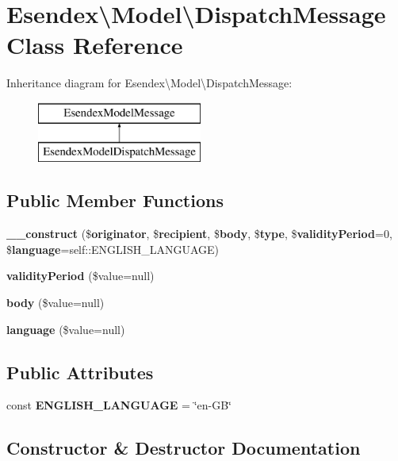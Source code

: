 \section{Esendex\textbackslash{}Model\textbackslash{}Dispatch\-Message Class Reference}
\label{class_esendex_1_1_model_1_1_dispatch_message}
Inheritance diagram for Esendex\textbackslash{}Model\textbackslash{}Dispatch\-Message\-:\begin{figure}[H]
\begin{center}
\leavevmode
\includegraphics[height=2.000000cm]{class_esendex_1_1_model_1_1_dispatch_message}
\end{center}
\end{figure}
\subsection*{Public Member Functions}
\begin{DoxyCompactItemize}
\item 
{\bf \-\_\-\-\_\-construct} (\${\bf originator}, \${\bf recipient}, \${\bf body}, \${\bf type}, \${\bf validity\-Period}=0, \${\bf language}=self\-::\-E\-N\-G\-L\-I\-S\-H\-\_\-\-L\-A\-N\-G\-U\-A\-G\-E)
\item 
{\bf validity\-Period} (\$value=null)
\item 
{\bf body} (\$value=null)
\item 
{\bf language} (\$value=null)
\end{DoxyCompactItemize}
\subsection*{Public Attributes}
\begin{DoxyCompactItemize}
\item 
const {\bfseries E\-N\-G\-L\-I\-S\-H\-\_\-\-L\-A\-N\-G\-U\-A\-G\-E} = \char`\"{}en-\/G\-B\char`\"{}\label{class_esendex_1_1_model_1_1_dispatch_message_a01b773ec9ac9f42ae9f4f209af96ad1e}

\end{DoxyCompactItemize}


\subsection{Constructor \& Destructor Documentation}
